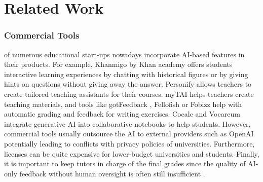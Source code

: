 \section{Related Work}
\iffalse
Current solutions, ... => put into related work
- privacy issues: models on foreign cloud servers such as chatGPT by openai
- often rely on proprietary, closed source models
- tutors are put out of "the loop" / student solutions are stored in different files (unnecessary overhead for swapping between solutions) / feedback not immediate
- limited support to directly grade code / combine grading with unit tests
\fi

\subsubsection{Commercial Tools}
of numerous educational start-ups nowadays incorporate AI-based features in their products. For example, Khanmigo by Khan academy \cite{khanmigo} offers students interactive learning experiences by chatting with historical figures or by giving hints on questions without giving away the answer. Personify \cite{personify} allows teachers to create tailored teaching assistants for their courses. myTAI \cite{myTAI} helps teachers create teaching materials, and tools like gotFeedback \cite{gotFeedback}, Fellofish \cite{Fellofish} or Fobizz \cite{fobizz} help with automatic grading and feedback for writing exercises. Cocalc \cite{cocalc} and Vocareum \cite{vocareum} integrate generative AI into collaborative notebooks to help students. 
However, commercial tools usually outsource the AI to external providers such as OpenAI potentially leading to conflicts with privacy policies of universities. 
Furthermore, licenses can be quite expensive for lower-budget universities and students. %
Finally, it is important to keep tutors in charge of the final grades since the quality of AI-only feedback without human oversight is often still insufficient \cite{muehlhoff2025chatbotsimschulunterrichtwir}.

